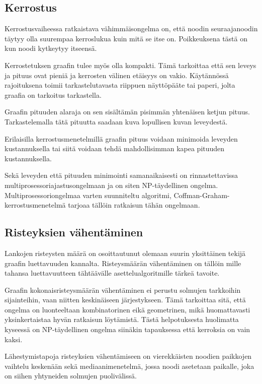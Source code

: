 \documentclass[finnish,12pt]{article}
\begin{document}
		\subsection{Kerrostus}

Kerrostusvaiheessa ratkaistava vähimmäisongelma on, että noodin seuraajanoodin täytyy olla suurempaa kerroslukua kuin mitä se itse on. Poikkeuksena tästä on kun noodi kytkeytyy itseensä.

Kerrostetuksen graafin tulee myös olla kompakti. Tämä tarkoittaa että sen leveys ja pituus ovat pieniä ja kerrosten välinen etäisyys on vakio. 
Käytännössä rajoituksena toimii tarkastelutavasta riippuen näyttöpääte tai paperi, jolta graafia on tarkoitus tarkastella.

Graafin pituuden alaraja on sen sisältämän pisimmän yhtenäisen ketjun pituus. Tarkastelemalla tätä pituutta saadaan kuva lopullisen kuvan leveydestä.

Erilaisilla kerrostusmenetelmillä graafin pituus voidaan minimoida leveyden kustannuksella tai siitä voidaan tehdä mahdollisimman kapea pituuden kustannuksella.

Sekä leveyden että pituuden minimointi samanaikaisesti on rinnastettavissa multiprosessoriajastusongelmaan ja on siten NP-täydellinen ongelma. \cite{RefWorks:39}
Multiprosessoriongelmaa varten suunniteltu algoritmi, Coffman-Graham-kerrostusmenetelmä tarjoaa tällöin ratkaisun tähän ongelmaan.

		\subsection{Risteyksien vähentäminen}

Lankojen risteysten määrä on osoittautunut olemaan suurin yksittäinen tekijä graafin luettavuuden kannalta. \cite{RefWorks:47}
Risteysmäärän vähentäminen on tällöin mille tahansa luettavuutteen tähtäävälle asettelualgoritmille tärkeä tavoite.

Graafin kokonaisristeysmäärän vähentäminen ei perustu solmujen tarkkoihin sijainteihin, vaan niitten keskinäiseen järjestykseen. Tämä tarkoittaa sitä, että ongelma on luonteeltaan kombinatorinen eikä geometrinen, mikä huomattavasti yksinkertaistaa hyvän ratkaisun löytämistä.
Tästä helpotuksesta huolimatta kyseessä on NP-täydellinen ongelma siinäkin tapauksessa että kerroksia on vain kaksi. \cite{RefWorks:40}

Lähestymistapoja risteyksien vähentämiseen on vierekkäisten noodien paikkojen
vaihtelu keskenään sekä mediaanimenetelmä, jossa noodi asetetaan paikalle, joka
on siihen yhtyneiden solmujen puolivälissä.
\end{document}
